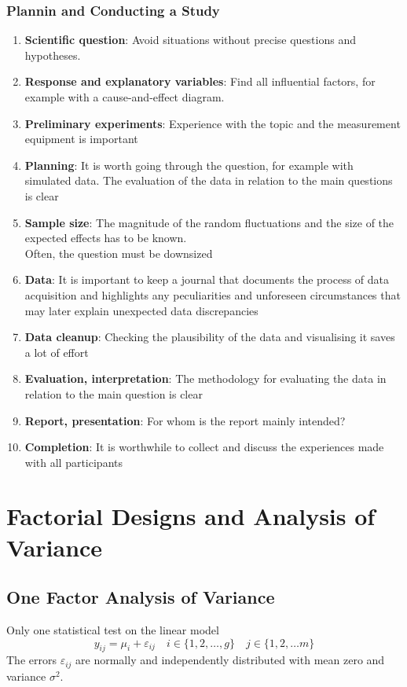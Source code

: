 \documentclass[11pt]{article}
\theoremstyle{definition}
\begin{document}
\subsubsection{Plannin and Conducting a Study}
\begin{enumerate}
	\item \textbf{Scientific question}: Avoid situations without precise questions and hypotheses.
	\item \textbf{Response and explanatory variables}: Find all influential factors, for example with a cause-and-effect diagram.
	\item \textbf{Preliminary experiments}: Experience with the topic and the measurement equipment is important
	\item \textbf{Planning}: It is worth going through the question, for example with simulated data. The evaluation of the data in relation to the main questions is clear
	\item \textbf{Sample size}: The magnitude of the random fluctuations and the size of the expected effects has to be known.\\ Often, the question must be downsized
	\item \textbf{Data}: It is important to keep a journal that documents the process of data acquisition and highlights any peculiarities and unforeseen circumstances that may later explain unexpected data discrepancies
	\item \textbf{Data cleanup}: Checking the plausibility of the data and visualising it saves a lot of effort
	\item \textbf{Evaluation, interpretation}: The methodology for evaluating the data in relation to the main question is clear
	\item \textbf{Report, presentation}: For whom is the report mainly intended?
	\item \textbf{Completion}: It is worthwhile to collect and discuss the experiences made with all participants
\end{enumerate}

\section{Factorial Designs and Analysis of Variance}
\subsection{One Factor Analysis of Variance}
Only one statistical test on the linear model
\begin{equation*}
	y_{ij} = \mu_i + \varepsilon_{ij}\quad i\in\{1,2,\dots,g\}\quad j\in\{1,2,\dots m\}
\end{equation*}
The errors $\varepsilon_{ij}$ are normally and independently distributed with mean zero and variance $\sigma^2$.
\end{document}
